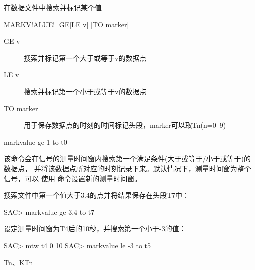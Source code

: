 \label{cmd:markvalue}

在数据文件中搜索并标记某个值

\begin{SACSTX}
MARKV!ALUE! [GE|LE v] [TO marker]
\end{SACSTX}

\begin{description}
\item [GE v] 搜索并标记第一个大于或等于v的数据点
\item [LE v] 搜索并标记第一个小于或等于v的数据点
\item [TO marker] 用于保存数据点的时刻的时间标记头段，marker可以取Tn(n=0--9)
\end{description}

\begin{SACDFT}
markvalue ge 1 to t0
\end{SACDFT}

该命令会在信号的测量时间窗内搜索第一个满足条件(大于或等于/小于或等于)的数据点，
并将该数据点所对应的时刻记录下来。默认情况下，测量时间窗为整个信号，可以
使用  命令设置新的测量时间窗。

搜索文件中第一个值大于3.4的点并将结果保存在头段T7中：
\begin{SACCode}
SAC> markvalue ge 3.4 to t7
\end{SACCode}

设定测量时间窗为T4后的10秒，并搜索第一个小于-3的值：
\begin{SACCode}
SAC> mtw t4 0 10
SAC> markvalue le -3 to t5
\end{SACCode}

Tn、KTn
